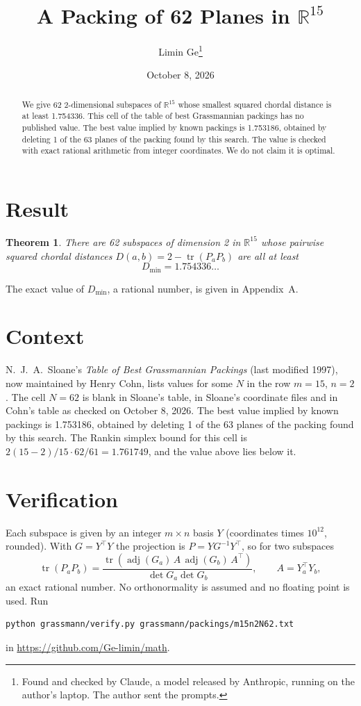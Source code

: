 \documentclass[11pt,a4paper]{article}
\title{A Packing of 62 Planes in $\mathbb{R}^{15}$}
\author{Limin Ge\thanks{Found and checked by Claude, a model released by Anthropic, running on the author's laptop. The author sent the prompts.}}
\date{October 8, 2026}
\newtheorem*{theorem}{Theorem}
\begin{document}
\maketitle
\begin{abstract}
We give 62 2-dimensional subspaces of $\mathbb{R}^{15}$ whose smallest squared chordal distance is at least 1.754336. This cell of the table of best Grassmannian packings has no published value. The best value implied by known packings is 1.753186, obtained by deleting 1 of the 63 planes of the packing found by this search. The value is checked with exact rational arithmetic from integer coordinates. We do not claim it is optimal.
\end{abstract}

\section{Result}
\begin{theorem}
There are 62 subspaces of dimension 2 in $\mathbb{R}^{15}$ whose pairwise squared chordal distances $D(a,b) = 2 - \operatorname{tr}(P_aP_b)$ are all at least
\[ D_{\min} = 1.754336\ldots \]
\end{theorem}
The exact value of $D_{\min}$, a rational number, is given in Appendix~A.


\section{Context}
N.~J.~A.~Sloane's \emph{Table of Best Grassmannian Packings} (last modified 1997), now maintained by Henry Cohn, lists values for some $N$ in the row $m=15$, $n=2$. The cell $N=62$ is blank in Sloane's table, in Sloane's coordinate files and in Cohn's table as checked on October 8, 2026. The best value implied by known packings is 1.753186, obtained by deleting 1 of the 63 planes of the packing found by this search. The Rankin simplex bound for this cell is $2(15-2)/15\cdot 62/61 = 1.761749$, and the value above lies below it.


\section{Verification}
Each subspace is given by an integer $m\times n$ basis $Y$ (coordinates times $10^{12}$, rounded). With $G=Y^\top Y$ the projection is $P=YG^{-1}Y^\top$, so for two subspaces
\[ \operatorname{tr}(P_aP_b)=\frac{\operatorname{tr}(\operatorname{adj}(G_a)\,A\,\operatorname{adj}(G_b)\,A^\top)}{\det G_a\det G_b},\qquad A=Y_a^\top Y_b, \]
an exact rational number. No orthonormality is assumed and no floating point is used. Run
\begin{verbatim}
python grassmann/verify.py grassmann/packings/m15n2N62.txt
\end{verbatim}
in \url{https://github.com/Ge-limin/math}.
\end{document}
